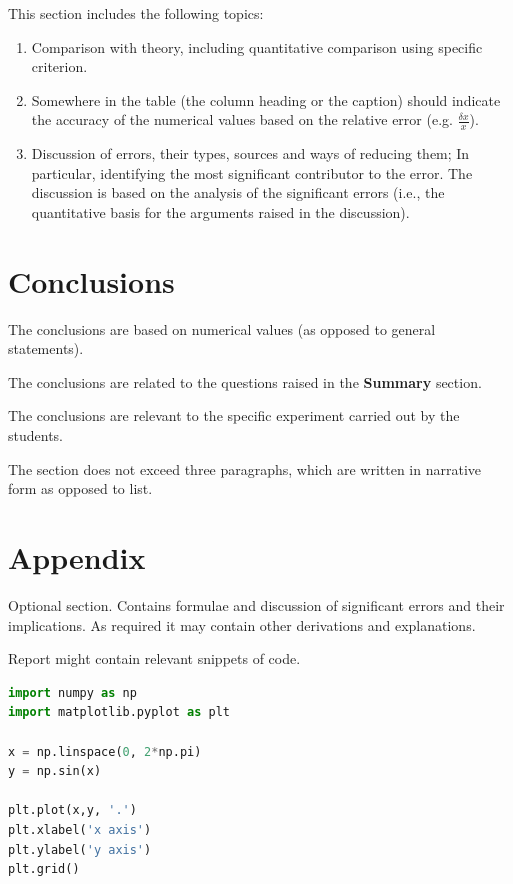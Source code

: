 \documentclass[a4paper,12pt]{article}
\begin{document}
This section includes the following topics:
\begin{enumerate}
    \item Comparison with theory, including quantitative comparison using specific criterion.
    \item  Somewhere in the table (the column heading or the caption) should indicate the accuracy of the numerical values based on the relative error (e.g. $\frac{\delta x}{x}$).
    \item Discussion of errors, their types, sources and ways of reducing them; In particular, identifying the most significant contributor to the error. The discussion is based on the analysis of the significant errors (i.e., the quantitative basis for the arguments raised in the discussion).
\end{enumerate}


\section{Conclusions}
The conclusions are based on numerical values (as opposed to general statements). 

The conclusions are related to the questions raised in the \textbf{Summary} section.

The conclusions are relevant to the specific experiment carried out by the students.

The section does not exceed three paragraphs, which are written in narrative form as opposed to list.

\section*{Appendix}
Optional section. Contains formulae and discussion of significant errors and their implications. As required it may contain other derivations and explanations. 

Report might contain relevant snippets of code.
\begin{lstlisting}[language=Python, caption=Python code snippet example]
import numpy as np
import matplotlib.pyplot as plt

x = np.linspace(0, 2*np.pi)
y = np.sin(x)

plt.plot(x,y, '.')
plt.xlabel('x axis')
plt.ylabel('y axis')
plt.grid()
\end{lstlisting}


\printbibliography  %
  
\end{document}
